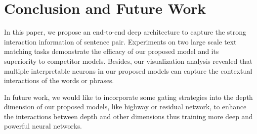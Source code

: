 \documentclass{article}
\begin{document}
\section{Conclusion and Future Work}
In this paper, we propose an end-to-end deep architecture to capture the strong interaction information of sentence pair. Experiments on two large scale text matching tasks demonstrate the efficacy of our proposed model and its superiority to competitor models.
Besides, our visualization analysis revealed that multiple interpretable neurons in our proposed models can capture the contextual interactions of the words or phrases.

In future work, we would like to incorporate some gating strategies into the depth dimension of our proposed models, like highway or residual network, to enhance the interactions between depth and other dimensions thus training more deep and powerful neural networks.



\end{document}
